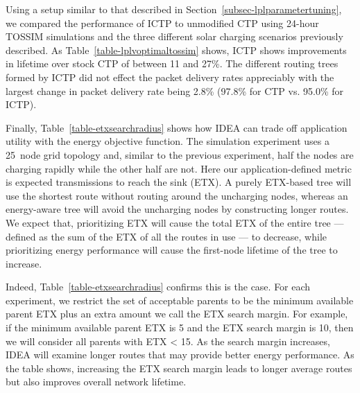 \documentclass{sig-alternate}
\begin{document}
Using a setup similar to that described in
Section~\ref{subsec-lplparametertuning}, we compared the performance of ICTP
to unmodified CTP using 24-hour TOSSIM simulations and the three different
solar charging scenarios previously described. As
Table~\ref{table-lplvoptimaltossim} shows, ICTP shows improvements in
lifetime over stock CTP of between 11 and 27\%. The different routing trees
formed by ICTP did not effect the packet delivery rates appreciably with the
largest change in packet delivery rate being 2.8\% (97.8\% for CTP vs. 95.0\%
for ICTP).

Finally, Table~\ref{table-etxsearchradius} shows how IDEA can trade off
application utility with the energy objective function. The simulation
experiment uses a 25~node grid topology and, similar to the previous
experiment, half the nodes are charging rapidly while the other half are not.
Here our application-defined metric is expected transmissions to reach the
sink (ETX). A purely ETX-based tree will use the shortest route without
routing around the uncharging nodes, whereas an energy-aware tree will avoid
the uncharging nodes by constructing longer routes. We expect that,
prioritizing ETX will cause the total ETX of the entire tree --- defined as
the sum of the ETX of all the routes in use --- to decrease, while
prioritizing energy performance will cause the first-node lifetime of the
tree to increase.

Indeed, Table~\ref{table-etxsearchradius} confirms this is the case. For each
experiment, we restrict the set of acceptable parents to be the minimum
available parent ETX plus an extra amount we call the ETX search
margin. For example, if the minimum available parent ETX is 5 and the ETX
search margin is 10, then we will consider all parents with ETX < 15. As the
search margin increases, IDEA will examine longer routes that may provide
better energy performance. As the table shows, increasing the ETX search
margin leads to longer average routes but also improves overall network
lifetime.
\end{document}
